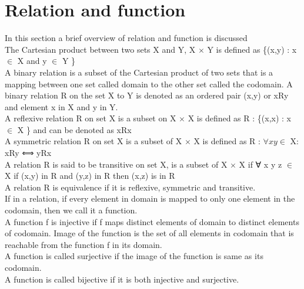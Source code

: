 \section{Relation and function}
In this section a brief overview of relation and function is discussed\\
The Cartesian product between two sets X and Y,  X \(\times\) Y is defined as \{(x,y) : x \(\in\) X and y \(\in\) Y \} \\
A binary relation is a subset of the Cartesian product of two sets that is a mapping between one set called domain to the other set called the codomain. A binary relation R on the set X to Y is denoted as an ordered pair (x,y) or xRy and element x in X and y in Y. \\
A reflexive relation R on set X is a subset on X \(\times\) X is defined as R : \{(x,x) : x \(\in\) X \} and can be denoted as xRx \\
A symmetric relation R on set X is a subset of X \(\times\) X is defined as R : \(\forall x y \in \) X: xRy ⟺ yRx \\
A relation R is said to be transitive on set X, is a subset of X \(\times\) X if ∀ x y z  \(\in\) X if (x,y) in R and (y,z) in R then (x,z) is in R\\
A relation R is equivalence if it is reflexive, symmetric and transitive. \\
If in a relation, if every element in domain is mapped to only one element in the codomain, then we call it a function.\\
A function f is injective if f maps distinct elements of domain to distinct elements of codomain.
Image of the function is the set of all elements in codomain that is reachable from the function f in its domain.\\
A function is called surjective if the image of the function is same as its codomain.\\
A function is called bijective if it is both injective and surjective.

